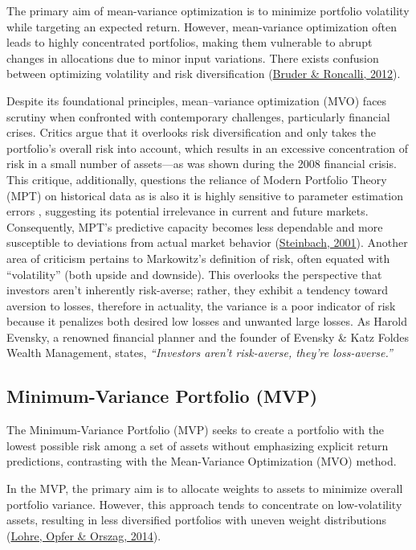 \documentclass[12pt,preprint, authoryear]{elsarticle}
\numberwithin{equation}{section}
\numberwithin{figure}{section}
\numberwithin{table}{section}
\begin{document}
The primary aim of mean-variance optimization is to minimize portfolio
volatility while targeting an expected return. However, mean-variance
optimization often leads to highly concentrated portfolios, making them
vulnerable to abrupt changes in allocations due to minor input
variations. There exists confusion between optimizing volatility and
risk diversification (\protect\hyperlink{ref-bruder2012managing}{Bruder
\& Roncalli, 2012}).

Despite its foundational principles, mean--variance optimization (MVO)
faces scrutiny when confronted with contemporary challenges,
particularly financial crises. Critics argue that it overlooks risk
diversification and only takes the portfolio's overall risk into
account, which results in an excessive concentration of risk in a small
number of assets---as was shown during the 2008 financial crisis. This
critique, additionally, questions the reliance of Modern Portfolio
Theory (MPT) on historical data as is also it is highly sensitive to
parameter estimation errors , suggesting its potential irrelevance in
current and future markets. Consequently, MPT's predictive capacity
becomes less dependable and more susceptible to deviations from actual
market behavior
(\protect\hyperlink{ref-steinbach2001markowitz}{Steinbach, 2001}).
Another area of criticism pertains to Markowitz's definition of risk,
often equated with ``volatility'' (both upside and downside). This
overlooks the perspective that investors aren't inherently risk-averse;
rather, they exhibit a tendency toward aversion to losses, therefore in
actuality, the variance is a poor indicator of risk because it penalizes
both desired low losses and unwanted large losses. As Harold Evensky, a
renowned financial planner and the founder of Evensky \& Katz Foldes
Wealth Management, states, \emph{``Investors aren't risk-averse, they're
loss-averse.''}

\hypertarget{minimum-variance-portfolio-mvp}{%
\subsection{Minimum-Variance Portfolio
(MVP)}\label{minimum-variance-portfolio-mvp}}

The Minimum-Variance Portfolio (MVP) seeks to create a portfolio with
the lowest possible risk among a set of assets without emphasizing
explicit return predictions, contrasting with the Mean-Variance
Optimization (MVO) method.

In the MVP, the primary aim is to allocate weights to assets to minimize
overall portfolio variance. However, this approach tends to concentrate
on low-volatility assets, resulting in less diversified portfolios with
uneven weight distributions
(\protect\hyperlink{ref-lohre2014diversifying}{Lohre, Opfer \& Orszag,
2014}).
\end{document}
